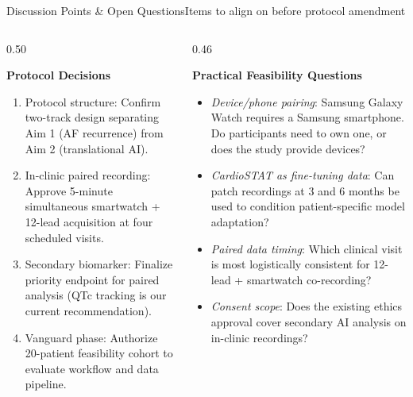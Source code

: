 \documentclass[aspectratio=169,10pt]{beamer}
\begin{document}
\begin{frame}{Discussion Points \& Open Questions}{Items to align on before protocol amendment}
\begin{columns}[T]
  \begin{column}{0.50\textwidth}
    \begin{block}{\textbf{Protocol Decisions}}
      \scriptsize
      \begin{enumerate}
        \setlength{\itemsep}{0.25em}
        \item Protocol structure: Confirm two-track design separating Aim 1 (AF recurrence) from Aim 2 (translational AI).
        \item In-clinic paired recording: Approve 5-minute simultaneous smartwatch + 12-lead acquisition at four scheduled visits.
        \item Secondary biomarker: Finalize priority endpoint for paired analysis (QTc tracking is our current recommendation).
        \item Vanguard phase: Authorize 20-patient feasibility cohort to evaluate workflow and data pipeline.
      \end{enumerate}
    \end{block}
  \end{column}
  \begin{column}{0.46\textwidth}
    \begin{block}{\textbf{Practical Feasibility Questions}}
      \scriptsize
      \begin{itemize}
        \setlength{\itemsep}{0.25em}
        \item \textit{Device/phone pairing}: Samsung Galaxy Watch requires a Samsung smartphone. Do participants need to own one, or does the study provide devices?
        \item \textit{CardioSTAT as fine-tuning data}: Can patch recordings at 3 and 6 months be used to condition patient-specific model adaptation?
        \item \textit{Paired data timing}: Which clinical visit is most logistically consistent for 12-lead + smartwatch co-recording?
        \item \textit{Consent scope}: Does the existing ethics approval cover secondary AI analysis on in-clinic recordings?
      \end{itemize}

\end{block}
\end{column}
\end{columns}
\end{frame}
\end{document}
